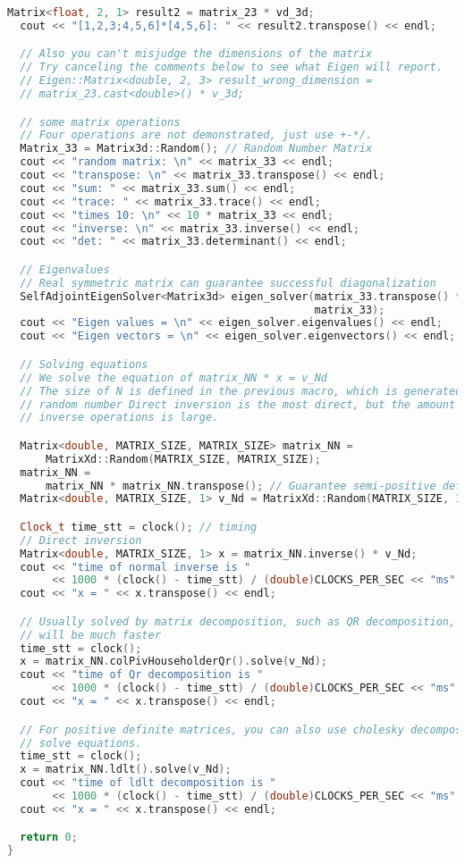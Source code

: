 \begin{lstlisting}[language=c++,caption=slambook2/ch3/useEigen/eigenMatrix.cpp]
  Matrix<float, 2, 1> result2 = matrix_23 * vd_3d;
  cout << "[1,2,3;4,5,6]*[4,5,6]: " << result2.transpose() << endl;

  // Also you can't misjudge the dimensions of the matrix
  // Try canceling the comments below to see what Eigen will report.
  // Eigen::Matrix<double, 2, 3> result_wrong_dimension =
  // matrix_23.cast<double>() * v_3d;

  // some matrix operations
  // Four operations are not demonstrated, just use +-*/.
  Matrix_33 = Matrix3d::Random(); // Random Number Matrix
  cout << "random matrix: \n" << matrix_33 << endl;
  cout << "transpose: \n" << matrix_33.transpose() << endl;
  cout << "sum: " << matrix_33.sum() << endl;
  cout << "trace: " << matrix_33.trace() << endl;
  cout << "times 10: \n" << 10 * matrix_33 << endl;
  cout << "inverse: \n" << matrix_33.inverse() << endl;
  cout << "det: " << matrix_33.determinant() << endl;

  // Eigenvalues
  // Real symmetric matrix can guarantee successful diagonalization
  SelfAdjointEigenSolver<Matrix3d> eigen_solver(matrix_33.transpose() *
                                                matrix_33);
  cout << "Eigen values = \n" << eigen_solver.eigenvalues() << endl;
  cout << "Eigen vectors = \n" << eigen_solver.eigenvectors() << endl;

  // Solving equations
  // We solve the equation of matrix_NN * x = v_Nd
  // The size of N is defined in the previous macro, which is generated by a
  // random number Direct inversion is the most direct, but the amount of
  // inverse operations is large.

  Matrix<double, MATRIX_SIZE, MATRIX_SIZE> matrix_NN =
      MatrixXd::Random(MATRIX_SIZE, MATRIX_SIZE);
  matrix_NN =
      matrix_NN * matrix_NN.transpose(); // Guarantee semi-positive definite
  Matrix<double, MATRIX_SIZE, 1> v_Nd = MatrixXd::Random(MATRIX_SIZE, 1);

  Clock_t time_stt = clock(); // timing
  // Direct inversion
  Matrix<double, MATRIX_SIZE, 1> x = matrix_NN.inverse() * v_Nd;
  cout << "time of normal inverse is "
       << 1000 * (clock() - time_stt) / (double)CLOCKS_PER_SEC << "ms" << endl;
  cout << "x = " << x.transpose() << endl;

  // Usually solved by matrix decomposition, such as QR decomposition, the speed
  // will be much faster
  time_stt = clock();
  x = matrix_NN.colPivHouseholderQr().solve(v_Nd);
  cout << "time of Qr decomposition is "
       << 1000 * (clock() - time_stt) / (double)CLOCKS_PER_SEC << "ms" << endl;
  cout << "x = " << x.transpose() << endl;

  // For positive definite matrices, you can also use cholesky decomposition to
  // solve equations.
  time_stt = clock();
  x = matrix_NN.ldlt().solve(v_Nd);
  cout << "time of ldlt decomposition is "
       << 1000 * (clock() - time_stt) / (double)CLOCKS_PER_SEC << "ms" << endl;
  cout << "x = " << x.transpose() << endl;

  return 0;
}
\end{lstlisting}

